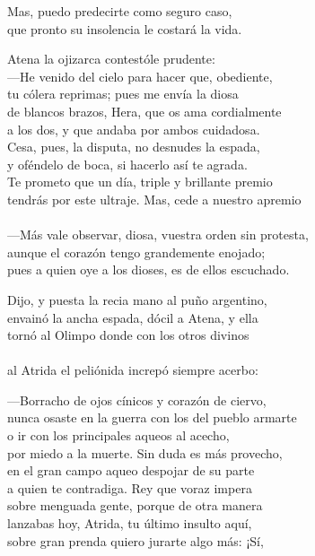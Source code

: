 Mas, puedo predecirte como seguro caso,\\
que pronto su insolencia le costará la vida.\par
Atena la ojizarca contestóle prudente:\\
---He venido del cielo para hacer que, obediente,\\
tu cólera reprimas; pues me envía la diosa\\
de blancos brazos, Hera, que os ama cordialmente\\
a los dos, y que andaba por ambos cuidadosa.\\
Cesa, pues, la disputa, no desnudes la espada,\\
y oféndelo de boca, si hacerlo así te agrada.\\
Te prometo que un día, triple y brillante premio\\
tendrás por este ultraje. Mas, cede a nuestro apremio\\
\\
---Más vale observar, diosa, vuestra orden sin protesta,\\
aunque el corazón tengo grandemente enojado;\\
pues a quien oye a los dioses, es de ellos escuchado.\par
Dijo, y puesta la recia mano al puño argentino,\\
envainó la ancha espada, dócil a Atena, y ella\\
tornó al Olimpo donde con los otros divinos\\
\\
al Atrida el peliónida increpó siempre acerbo:\par
---Borracho de ojos cínicos y corazón de ciervo,\\
nunca osaste en la guerra con los del pueblo armarte\\
o ir con los principales aqueos al acecho,\\
por miedo a la muerte. Sin duda es más provecho,\\
en el gran campo aqueo despojar de su parte\\
a quien te contradiga. Rey que voraz impera\\
sobre menguada gente, porque de otra manera\\
lanzabas hoy, Atrida, tu último insulto aquí,\\
sobre gran prenda quiero jurarte algo más: ¡Sí,\\
